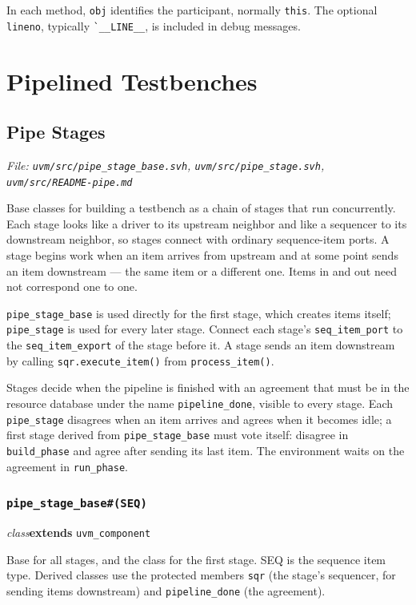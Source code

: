 \documentclass[11pt,letterpaper]{report}
\begin{document}
In each method, \texttt{obj} identifies the participant, normally \texttt{this}. The optional \texttt{lineno}, typically \texttt{\`{}\_\_LINE\_\_}, is included in debug messages.

\chapter{Pipelined Testbenches}
\section{Pipe Stages}
\noindent\small\textit{File: \texttt{uvm/src/pipe\_stage\_base.svh}, \texttt{uvm/src/pipe\_stage.svh}, \texttt{uvm/src/README-pipe.md}}\par

Base classes for building a testbench as a chain of stages that run concurrently. Each stage looks like a driver to its upstream neighbor and like a sequencer to its downstream neighbor, so stages connect with ordinary sequence-item ports. A stage begins work when an item arrives from upstream and at some point sends an item downstream --- the same item or a different one. Items in and out need not correspond one to one.

\texttt{pipe\_stage\_base} is used directly for the first stage, which creates items itself; \texttt{pipe\_stage} is used for every later stage. Connect each stage's \texttt{seq\_item\_port} to the \texttt{seq\_item\_export} of the stage before it. A stage sends an item downstream by calling \texttt{sqr.execute\_item()} from \texttt{process\_item()}.

Stages decide when the pipeline is finished with an agreement that must be in the resource database under the name \texttt{pipeline\_done}, visible to every stage. Each \texttt{pipe\_stage} disagrees when an item arrives and agrees when it becomes idle; a first stage derived from \texttt{pipe\_stage\_base} must vote itself: disagree in \texttt{build\_phase} and agree after sending its last item. The environment waits on the agreement in \texttt{run\_phase}.

\subsection*{\texttt{pipe\_stage\_base\#(SEQ)}}
\noindent\small\textit{class}\quad \textbf{extends} \texttt{uvm\_component}\par

Base for all stages, and the class for the first stage. SEQ is the sequence item type. Derived classes use the protected members \texttt{sqr} (the stage's sequencer, for sending items downstream) and \texttt{pipeline\_done} (the agreement).
\end{document}
